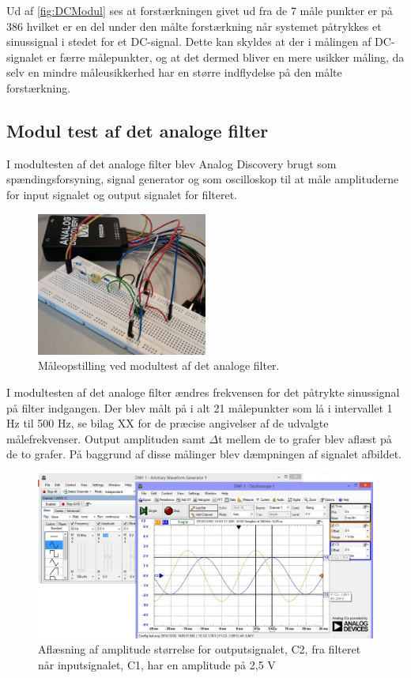 Ud af \ref{fig:DCModul} ses at forstærkningen givet ud fra de 7 måle punkter er på 386 hvilket er en del under den målte forstærkning når systemet påtrykkes et sinussignal i stedet for et DC-signal. Dette kan skyldes at der i målingen af DC-signalet er færre målepunkter, og at det dermed bliver en mere usikker måling, da selv en mindre måleusikkerhed har en større indflydelse på den målte forstærkning.




\subsection{Modul test af det analoge filter}
I modultesten af det analoge filter blev Analog Discovery brugt som spændingsforsyning, signal generator og som oscilloskop til at måle amplituderne for input signalet og output signalet for filteret.

\begin{figure}[H]
	\centering
	\includegraphics[width=0.5\textwidth]{Figurer/Hardware/FilterTest}
	\caption{Måleopstilling ved modultest af det analoge filter.}
	\label{fig:FilterTest}
\end{figure}

I modultesten af det analoge filter ændres frekvensen for det påtrykte sinussignal på filter indgangen. Der blev målt på i alt 21 målepunkter som lå i intervallet 1 Hz til 500 Hz, se bilag XX for de præcise angivelser af de udvalgte målefrekvenser. Output amplituden samt $\Delta$t mellem de to grafer blev aflæst på de to grafer. På baggrund af disse målinger blev dæmpningen af signalet afbildet. 

\begin{figure}[H]
	\centering
	\includegraphics[width=1\textwidth]{Figurer/Hardware/AnalogScreenFilterAmp}
	\caption{Aflæsning af amplitude størrelse for outputsignalet, C2, fra filteret når inputsignalet, C1, har en amplitude på 2,5 V}
	\label{fig:FilterAmplitude}
\end{figure}

